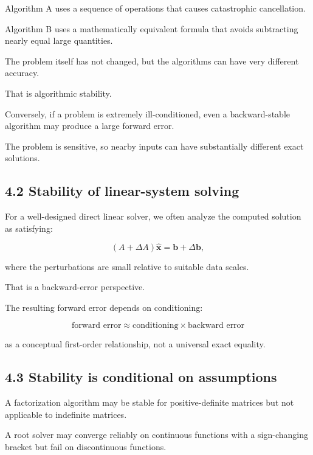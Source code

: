 Algorithm A uses a sequence of operations that causes catastrophic cancellation.

Algorithm B uses a mathematically equivalent formula that avoids subtracting nearly equal large quantities.

The problem itself has not changed, but the algorithms can have very different accuracy.

That is algorithmic stability.

Conversely, if a problem is extremely ill-conditioned, even a backward-stable algorithm may produce a large forward error.

The problem is sensitive, so nearby inputs can have substantially different exact solutions.

\subsection{4.2 Stability of linear-system solving}\label{02-foundations-ii-ch028-stability-of-linear-system-solving}

\hypertarget{02-foundations-ii-ch028-stability-of-linear-system-solving}{}

For a well-designed direct linear solver, we often analyze the computed solution as satisfying:

\[ (A+\Delta A)\hat{\mathbf x} = \mathbf b+\Delta\mathbf b, \]

where the perturbations are small relative to suitable data scales.

That is a backward-error perspective.

The resulting forward error depends on conditioning:

\[ \boxed{ \text{forward error} \approx \text{conditioning}\times \text{backward error} } \]

as a conceptual first-order relationship, not a universal exact equality.

\subsection{4.3 Stability is conditional on assumptions}\label{02-foundations-ii-ch028-stability-is-conditional-on-assumptions}

\hypertarget{02-foundations-ii-ch028-stability-is-conditional-on-assumptions}{}

A factorization algorithm may be stable for positive-definite matrices but not applicable to indefinite matrices.

A root solver may converge reliably on continuous functions with a sign-changing bracket but fail on discontinuous functions.

